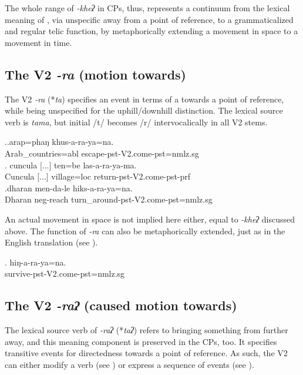 The whole range of   \emph{-kheʔ}  in CPs, thus, represents a con\-tinuum from the lexical meaning of ,  via unspecific  away from a point of reference, to a grammaticalized and regular telic function, by metaphorically extending a movement in space to a movement in time.
	
\subsection{The V2 \emph{-ra} (motion towards)}\label{V2-comeneut} %

The V2 \emph{-ra} (*\emph{ta})  specifies an event in terms of  a  towards a point of reference, while being  unspecified for the uphill/downhill distinction. The lexical source verb is \emph{tama}, but  initial /t/ becomes /r/ intervocalically in all V2 stems.

\ex.\ag.arap=phaŋ khus-a-ra-ya=na.\\
Arab\_countries{\sc =abl} escape{\sc [3sg]-pst-V2.come-pst=nmlz.sg}\\
\bg. cuncula [...] ten=be las-a-ra-ya-ma.\\
Cuncula [...] village{\sc =loc} return{\sc [3sg]-pst-V2.come-pst-prf}\\
 
\bg.dharan men-da-le hiks-a-ra-ya=na.\\
Dharan {\sc neg-}reach turn\_around{\sc [3sg]-pst-V2.come-pst=nmlz.sg}\\

An actual movement in space is not implied here either, equal to \emph{-kheʔ} discussed above. The function of \emph{-ra} can also be metaphorically extended, just as in the English translation (see \Next).

\exg. hiŋ-a-ra-ya=na.\\
survive{\sc [3sg]-pst-V2.come-pst=nmlz.sg}\\


\subsection{The V2 \emph{-raʔ}  (caused motion towards)}\label{V2-bringneut}%

The lexical source verb of  \emph{-raʔ} (*\emph{taʔ})   refers to bringing something from further away, and this meaning component is preserved in the CPs, too. It specifies transitive events for directedness towards a point of reference. As such, the V2 can either modify a  verb (see \Next[a]) or express a sequence of events (see \Next[b]).

